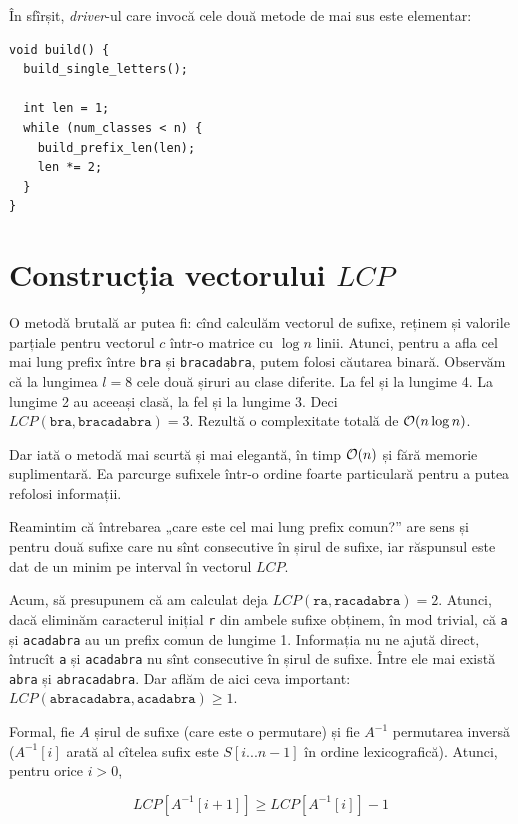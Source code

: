 \documentclass[../main.tex]{subfiles}
\begin{document}
În sfîrșit, \textit{driver}-ul care invocă cele două metode de mai sus este elementar:

\begin{verbatim}
void build() {
  build_single_letters();

  int len = 1;
  while (num_classes < n) {
    build_prefix_len(len);
    len *= 2;
  }
}
\end{verbatim}

\section{Construcția vectorului \texorpdfstring{$LCP$}{LCP}}

O metodă brutală ar putea fi: cînd calculăm vectorul de sufixe, reținem și valorile parțiale pentru vectorul $c$ într-o matrice cu $\log n$ linii. Atunci, pentru a afla cel mai lung prefix între \texttt{bra} și \texttt{bracadabra}, putem folosi căutarea binară. Observăm că la lungimea $l=8$ cele două șiruri au clase diferite. La fel și la lungime 4. La lungime 2 au aceeași clasă, la fel și la lungime 3. Deci $LCP(\texttt{bra}, \texttt{bracadabra}) = 3$. Rezultă o complexitate totală de $\mathcal{O}(n \log n)$.

Dar iată o metodă mai scurtă și mai elegantă, în timp $\mathcal{O}(n)$ și fără memorie suplimentară. Ea parcurge sufixele într-o ordine foarte particulară pentru a putea refolosi informații.

Reamintim că întrebarea „care este cel mai lung prefix comun?” are sens și pentru două sufixe care nu sînt consecutive în șirul de sufixe, iar răspunsul este dat de un minim pe interval în vectorul $LCP$.

Acum, să presupunem că am calculat deja $LCP(\texttt{ra}, \texttt{racadabra}) = 2$. Atunci, dacă eliminăm caracterul inițial \texttt{r} din ambele sufixe obținem, în mod trivial, că \texttt{a} și \texttt{acadabra} au un prefix comun de lungime 1. Informația nu ne ajută direct, întrucît \texttt{a} și \texttt{acadabra} nu sînt consecutive în șirul de sufixe. Între ele mai există \texttt{abra} și \texttt{abracadabra}. Dar aflăm de aici ceva important: $LCP(\texttt{abracadabra}, \texttt{acadabra}) \geq 1$.

Formal, fie $A$ șirul de sufixe (care este o permutare) și fie $A^{-1}$ permutarea inversă ($A^{-1}[i]$ arată al cîtelea sufix este $S[i...n-1]$ în ordine lexicografică). Atunci, pentru orice $i > 0$,

$$LCP[A^{-1}[i + 1]] \geq LCP[A^{-1}[i]] - 1$$
\end{document}

